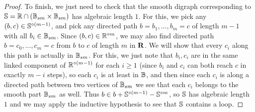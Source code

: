 \documentclass[letterpaper,11pt]{article}
\begin{document}
\begin{proof}
To finish, we just need to check that the smooth digraph corresponding to $\mathbb{S} = \mathbb{R} \cap (\mathbb{B}_{sm} \times \mathbb{B}_{sm})$ has algebraic length $1$. For this, we pick any $(b,c) \in \mathbb{S}^{\circ (m-1)}$, and pick any directed path $b = b_1, ..., b_m = c$ of length $m-1$ with all $b_i \in \mathbb{B}_{sm}$. Since $(b,c) \in \mathbb{R}^{\circ m}$, we may also find directed path $b = c_0, ..., c_m = c$ from $b$ to $c$ of length $m$ in $\mathbf{R}$. We will show that every $c_i$ along this path is actually in $\mathbb{B}_{sm}$. For this, we just note that $b_i,c_i$ are in the same linked component of $\mathbb{R}^{\circ (m-1)}$ for each $i \ge 1$ (since $b_i$ and $c_i$ can both reach $c$ in exactly $m-i$ steps), so each $c_i$ is at least in $\mathbb{B}$, and then since each $c_i$ is along a directed path between two vertices of $\mathbb{B}_{sm}$ we see that each $c_i$ belongs to the smooth part $\mathbb{B}_{sm}$ as well. Thus $b \in b + \mathbb{S}^{\circ (m-1)} - \mathbb{S}^{\circ m}$, so $\mathbb{S}$ has algebraic length $1$ and we may apply the inductive hypothesis to see that $\mathbb{S}$ contains a loop.
\end{proof}
\end{document}
